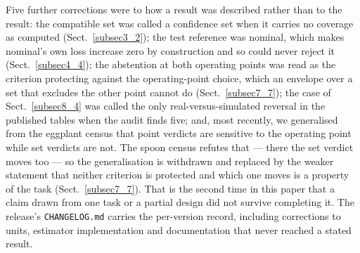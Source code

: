 \documentclass[pdflatex,iicol,sn-apa]{sn-jnl}
\theoremstyle{remark}
\begin{document}
\begin{appendices}
Five further corrections were to how a result was described rather than to the result: the
compatible set was called a confidence set when it carries no coverage as computed
(Sect.~\ref{subsec3_2}); the test reference was nominal, which makes nominal's own loss increase
zero by construction and so could never reject it (Sect.~\ref{subsec4_4}); the abstention at both
operating points was read as the criterion protecting against the operating-point choice, which an
envelope over a set that excludes the other point cannot do (Sect.~\ref{subsec7_7}); the case
of Sect.~\ref{subsec8_4} was called the only real-versus-simulated reversal in the published tables
when the audit finds five; and, most recently, we generalised from the eggplant census that point
verdicts are sensitive to the operating point while set verdicts are not. The spoon census refutes
that --- there the set verdict moves too --- so the generalisation is withdrawn and replaced by the
weaker statement that neither criterion is protected and which one moves is a property of the task
(Sect.~\ref{subsec7_7}). That is the second time in this paper that a claim drawn from one task or
a partial design did not survive completing it. The release's \texttt{CHANGELOG.md} carries the per-version record,
including corrections to units, estimator implementation and documentation that never reached a
stated result.

\end{appendices}


\end{document}
